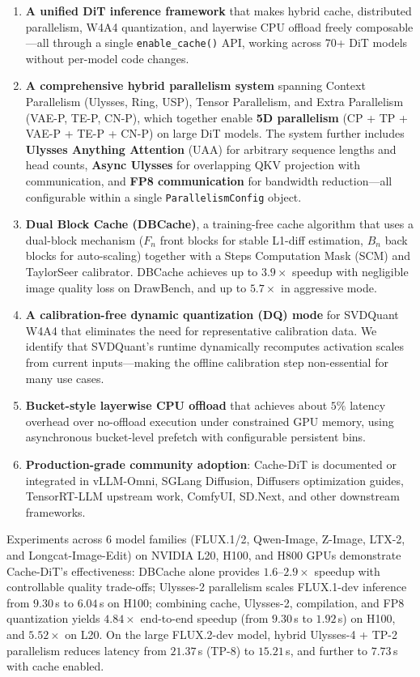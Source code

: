 \documentclass[10pt]{article}
\begin{document}
\begin{enumerate}
    \item \textbf{A unified DiT inference framework} that makes hybrid cache, distributed parallelism, W4A4 quantization, and layerwise CPU offload freely composable---all through a single \texttt{enable\_cache()} API, working across 70+ DiT models without per-model code changes.
    \item \textbf{A comprehensive hybrid parallelism system} spanning Context Parallelism (Ulysses, Ring, USP), Tensor Parallelism, and Extra Parallelism (VAE-P, TE-P, CN-P), which together enable \textbf{5D parallelism} (CP + TP + VAE-P + TE-P + CN-P) on large DiT models. The system further includes \textbf{Ulysses Anything Attention} (UAA) for arbitrary sequence lengths and head counts, \textbf{Async Ulysses} for overlapping QKV projection with communication, and \textbf{FP8 communication} for bandwidth reduction---all configurable within a single \texttt{ParallelismConfig} object.
    \item \textbf{Dual Block Cache (DBCache)}, a training-free cache algorithm that uses a dual-block mechanism ($F_n$ front blocks for stable L1-diff estimation, $B_n$ back blocks for auto-scaling) together with a Steps Computation Mask (SCM) and TaylorSeer calibrator. DBCache achieves up to $3.9\times$ speedup with negligible image quality loss on DrawBench, and up to $5.7\times$ in aggressive mode.
    \item \textbf{A calibration-free dynamic quantization (DQ) mode} for SVDQuant W4A4 that eliminates the need for representative calibration data. We identify that SVDQuant's runtime dynamically recomputes activation scales from current inputs---making the offline calibration step non-essential for many use cases.
    \item \textbf{Bucket-style layerwise CPU offload} that achieves about $5\%$ latency overhead over no-offload execution under constrained GPU memory, using asynchronous bucket-level prefetch with configurable persistent bins.
    \item \textbf{Production-grade community adoption}: Cache-DiT is documented or integrated in vLLM-Omni, SGLang Diffusion, Diffusers optimization guides, TensorRT-LLM upstream work, ComfyUI, SD.Next, and other downstream frameworks.
\end{enumerate}

Experiments across 6 model families (FLUX.1/2, Qwen-Image, Z-Image, LTX-2, and Longcat-Image-Edit) on NVIDIA L20, H100, and H800 GPUs demonstrate Cache-DiT's effectiveness: DBCache alone provides $1.6$--$2.9\times$ speedup with controllable quality trade-offs; Ulysses-2 parallelism scales FLUX.1-dev inference from $9.30$\,s to $6.04$\,s on H100; combining cache, Ulysses-2, compilation, and FP8 quantization yields $4.84\times$ end-to-end speedup (from $9.30$\,s to $1.92$\,s) on H100, and $5.52\times$ on L20. On the large FLUX.2-dev model, hybrid Ulysses-4 + TP-2 parallelism reduces latency from $21.37$\,s (TP-8) to $15.21$\,s, and further to $7.73$\,s with cache enabled.
\end{document}
